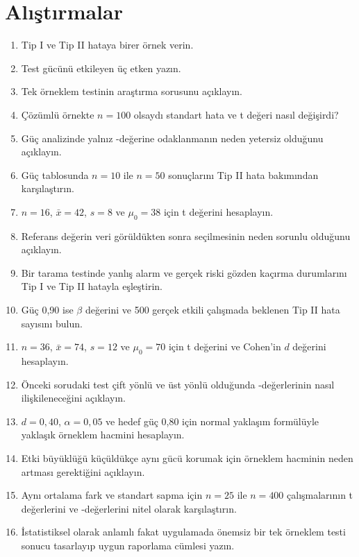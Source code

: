 \section*{Alıştırmalar}

\begin{enumerate}
  \item Tip I ve Tip II hataya birer örnek verin.
  \item Test gücünü etkileyen üç etken yazın.
  \item Tek örneklem \tstat testinin araştırma sorusunu açıklayın.
  \item Çözümlü örnekte $n=100$ olsaydı standart hata ve t değeri nasıl değişirdi?
  \item Güç analizinde yalnız \pval-değerine odaklanmanın neden yetersiz olduğunu açıklayın.
  \item Güç tablosunda $n=10$ ile $n=50$ sonuçlarını Tip II hata bakımından karşılaştırın.
  \item $n=16$, $\bar x=42$, $s=8$ ve $\mu_0=38$ için t değerini hesaplayın.
  \item Referans değerin veri görüldükten sonra seçilmesinin neden sorunlu olduğunu açıklayın.
  \item Bir tarama testinde yanlış alarm ve gerçek riski gözden kaçırma
  durumlarını Tip I ve Tip II hatayla eşleştirin.
  \item Güç 0,90 ise $\beta$ değerini ve 500 gerçek etkili çalışmada beklenen
  Tip II hata sayısını bulun.
  \item $n=36$, $\bar x=74$, $s=12$ ve $\mu_0=70$ için t değerini ve
  Cohen'in $d$ değerini hesaplayın.
  \item Önceki sorudaki test çift yönlü ve üst yönlü olduğunda \pval-değerlerinin
  nasıl ilişkileneceğini açıklayın.
  \item $d=0{,}40$, $\alpha=0{,}05$ ve hedef güç 0,80 için normal yaklaşım
  formülüyle yaklaşık örneklem hacmini hesaplayın.
  \item Etki büyüklüğü küçüldükçe aynı gücü korumak için örneklem hacminin
  neden artması gerektiğini açıklayın.
  \item Aynı ortalama fark ve standart sapma için $n=25$ ile $n=400$
  çalışmalarının t değerlerini ve \pval-değerlerini nitel olarak karşılaştırın.
  \item İstatistiksel olarak anlamlı fakat uygulamada önemsiz bir tek örneklem
  \tstat testi sonucu tasarlayıp uygun raporlama cümlesi yazın.
\end{enumerate}